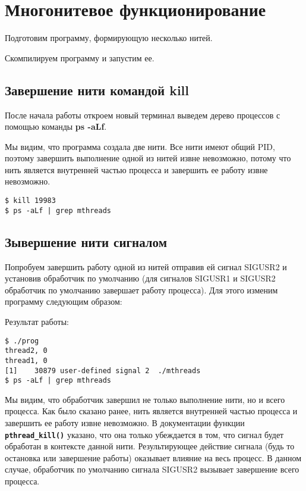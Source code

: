 \documentclass[a4paper]{article}
\begin{document}
\section{Многонитевое функционирование}
	Подготовим программу, формирующую несколько нитей.
	
	
	Скомпилируем программу и запустим ее. 
	
	
	\subsection{Завершение нити командой kill}	
	После начала работы откроем новый терминал выведем дерево процессов с помощью команды \textbf{ps -aLf}.
	
	
	Мы видим, что программа создала две нити. Все нити имеют общий PID, поэтому завершить выполнение одной из нитей извне невозможно, потому что нить является внутренней частью процесса и завершить ее работу извне невозможно.
	\begin{lstlisting}[style=crs_bash]		
$ kill 19983
$ ps -aLf | grep mthreads
 	\end{lstlisting}
 	
	\subsection{Зывершение нити сигналом}	
	Попробуем завершить работу одной из нитей отправив ей сигнал SIGUSR2 и установив обработчик по умолчанию (для сигналов SIGUSR1 и SIGUSR2 обработчик по умолчанию завершает работу процесса). Для этого изменим программу следующим образом:
	
	
	Результат работы:
	\begin{lstlisting}[style=crs_bash]		
$ ./prog
thread2, 0
thread1, 0
[1]    30879 user-defined signal 2  ./mthreads
$ ps -aLf | grep mthreads
 	\end{lstlisting}
 	
 	Мы видим, что обработчик завершил не только выполнение нити, но и всего процесса. Как было сказано ранее, нить является внутренней частью процесса и завершить ее работу извне невозможно. В документации функции \textbf{\texttt{pthread\_kill()}} указано, что она только убеждается в том, что сигнал будет обработан в контексте данной нити. Результирующее действие сигнала (будь то остановка или завершение работы) оказывает влияние на весь процесс. В данном случае, обработчик по умолчанию сигнала SIGUSR2 вызывает завершение всего процесса.
 	
\end{document}
